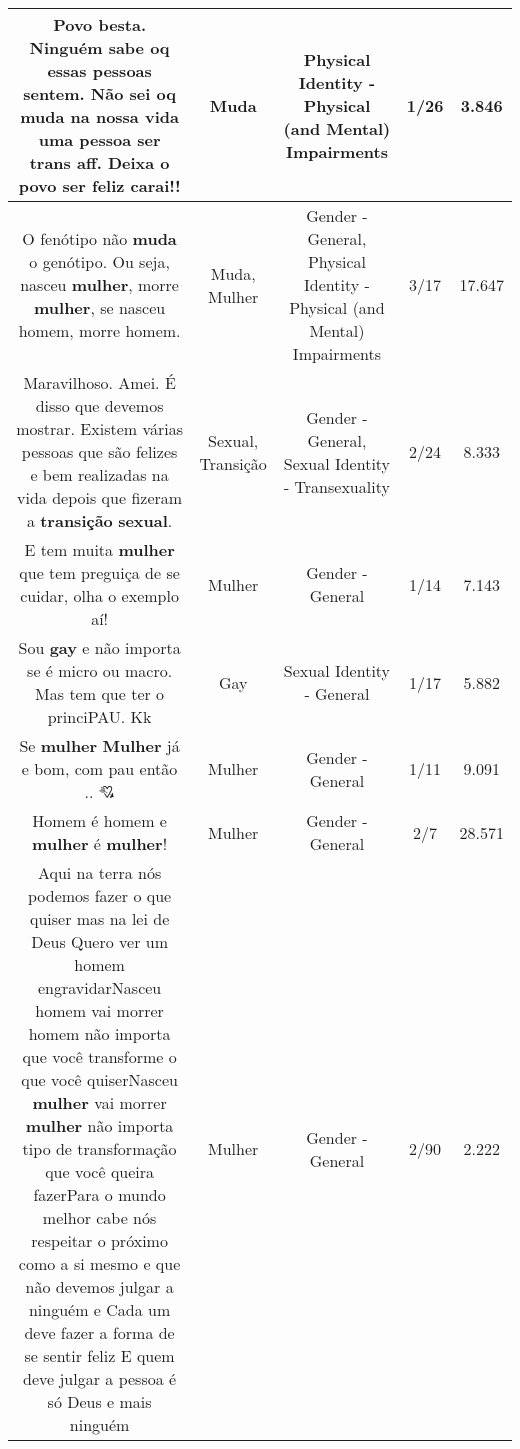 \documentclass[11pt]{article}
\newlength\mylength
\begin{document}
\begin{center}
\begin{longtable}{|C{.65\mylength}|C{.30\mylength}|C{.12\mylength}|C{.12\mylength}|C{.12\mylength}|}
  \small Povo besta. Ninguém sabe oq essas pessoas sentem. Não sei oq \textbf{muda} na nossa vida uma pessoa ser trans aff. Deixa o povo ser feliz carai!!\normalsize   & Muda & Physical Identity - Physical (and Mental) Impairments & 1/26 & 3.846 \\  \hline
  \small O fenótipo não \textbf{muda} o genótipo. Ou seja, nasceu \textbf{mulher}, morre \textbf{mulher}, se nasceu homem, morre homem.\normalsize   & Muda, Mulher & Gender - General, Physical Identity - Physical (and Mental) Impairments & 3/17 & 17.647 \\  \hline
  \small Maravilhoso. Amei. É disso que devemos mostrar.  Existem várias pessoas que são felizes e bem realizadas na vida depois que fizeram a \textbf{transição} \textbf{sexual}.\normalsize   & Sexual, Transição & Gender - General, Sexual Identity - Transexuality & 2/24 & 8.333 \\  \hline
  \small E tem muita \textbf{mulher} que tem preguiça de se cuidar, olha o exemplo aí!\normalsize   & Mulher & Gender - General & 1/14 & 7.143 \\  \hline
  \small Sou \textbf{gay} e não importa se é micro ou macro. Mas tem que ter o princiPAU. Kk\normalsize   & Gay & Sexual Identity - General & 1/17 & 5.882 \\  \hline
  \small Se \textbf{mulher} \textbf{Mulher} já e bom,  com pau então .. 💘\normalsize   & Mulher & Gender - General & 1/11 & 9.091 \\  \hline
  \small Homem é homem e \textbf{mulher} é \textbf{mulher}!\normalsize   & Mulher & Gender - General & 2/7 & 28.571 \\  \hline
  \small Aqui na terra nós podemos fazer o que quiser mas na lei de Deus Quero ver um homem engravidarNasceu homem vai morrer homem não importa que você transforme o que você quiserNasceu \textbf{mulher} vai morrer \textbf{mulher} não importa tipo de transformação que você queira fazerPara o mundo melhor cabe nós respeitar o próximo como a si mesmo e que não devemos julgar a ninguém e Cada um deve fazer a forma de se sentir feliz E quem deve julgar a pessoa é só Deus e mais ninguém\normalsize   & Mulher & Gender - General & 2/90 & 2.222 \\  \hline

\end{longtable}
\end{center}
\end{document}
